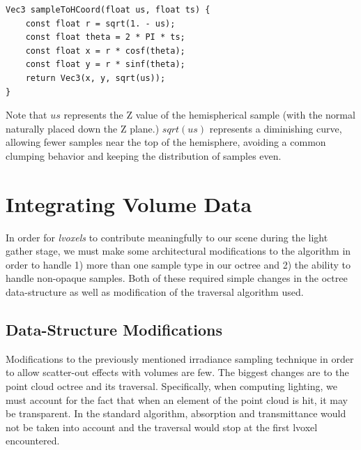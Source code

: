 \documentclass[12pt]{ucthesis}
\begin{document}

\begin{lstlisting}
Vec3 sampleToHCoord(float us, float ts) {
    const float r = sqrt(1. - us);
    const float theta = 2 * PI * ts;
    const float x = r * cosf(theta);
    const float y = r * sinf(theta);
    return Vec3(x, y, sqrt(us));
}
\end{lstlisting}

Note that $us$ represents the Z value of the hemispherical sample (with the normal naturally placed down the Z plane.)  $sqrt(us)$ represents a diminishing curve, allowing fewer samples near the top of the hemisphere, avoiding a common clumping behavior and keeping the distribution of samples even.





\section{Integrating Volume Data}
In order for \textit{lvoxels} to contribute meaningfully to our scene during the light gather stage, we must make some architectural modifications to the algorithm in order to handle 1) more than one sample type in our octree and 2) the ability to handle non-opaque samples.  Both of these required simple changes in the octree data-structure as well as modification of the traversal algorithm used.

\subsection{Data-Structure Modifications}
Modifications to the previously mentioned irradiance sampling technique in order to allow scatter-out effects with volumes are few.  The biggest changes are to the point cloud octree and its traversal.  Specifically, when computing lighting, we must account for the fact that when an element of the point cloud is hit, it may be transparent.  In the standard algorithm, absorption and transmittance would not be taken into account and the traversal would stop at the first lvoxel encountered.
\end{document}
